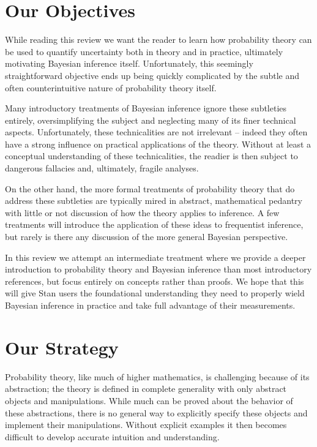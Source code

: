 \section{Our Objectives}

While reading this review we want the reader to learn how probability 
theory can be used to quantify uncertainty both in theory and in practice,
ultimately motivating Bayesian inference itself.  Unfortunately, this seemingly 
straightforward objective ends up being quickly complicated by the subtle 
and often counterintuitive nature of probability theory itself.  

Many introductory treatments of Bayesian inference ignore these subtleties
entirely, oversimplifying the subject and neglecting many of its finer technical 
aspects.  Unfortunately, these technicalities are not irrelevant -- indeed they
often have a strong influence on practical applications of  the theory.  Without 
at least a conceptual understanding of these technicalities, the readier is then 
subject to dangerous fallacies and, ultimately, fragile analyses.  

On the other hand, the more formal treatments of probability theory that do 
address these subtleties are typically mired in abstract, mathematical pedantry 
with little or not discussion of how the theory applies to inference.  A few
treatments will introduce the application of these ideas to frequentist inference,
but rarely is there any discussion of the more general Bayesian perspective.

In this review we attempt an intermediate treatment where we provide a deeper 
introduction to probability theory and Bayesian inference than most introductory
references, but focus entirely on concepts rather than proofs.  We hope that
this will give Stan users the foundational understanding they need to properly 
wield Bayesian inference in practice and take full advantage of their measurements.

\section{Our Strategy}

Probability theory, like much of higher mathematics, is challenging because
of its abstraction; the theory is defined in complete generality with only abstract 
objects and manipulations.  While much can be proved about the behavior
of these abstractions, there is no general way to explicitly specify these objects 
and implement their manipulations.  Without explicit examples it then becomes
difficult to develop accurate intuition and understanding.

